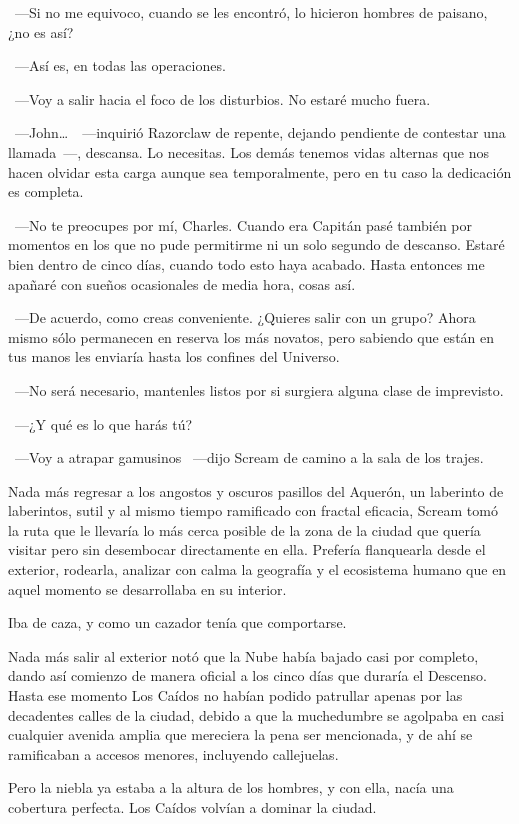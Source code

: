 ~---Si no me equivoco, cuando se les encontró, lo hicieron hombres de paisano, ¿no es así?

~---Así es, en todas las operaciones.

~---Voy a salir hacia el foco de los disturbios. No estaré mucho fuera.

~---John\dots\ ~---inquirió Razorclaw de repente, dejando pendiente de contestar una llamada~---, descansa. Lo necesitas. Los demás tenemos vidas alternas que nos hacen olvidar esta carga aunque sea temporalmente, pero en tu caso la dedicación es completa.

~---No te preocupes por mí, Charles. Cuando era Capitán pasé también por momentos en los que no pude permitirme ni un solo segundo de descanso. Estaré bien dentro de cinco días, cuando todo esto haya acabado. Hasta entonces me apañaré con sueños ocasionales de media hora, cosas así.

~---De acuerdo, como creas conveniente. ¿Quieres salir con un grupo? Ahora mismo sólo permanecen en reserva los más novatos, pero sabiendo que están en tus manos les enviaría hasta los confines del Universo.

~---No será necesario, mantenles listos por si surgiera alguna clase de imprevisto.

~---¿Y qué es lo que harás tú?

~---Voy a atrapar gamusinos ~---dijo Scream de camino a la sala de los trajes.

\bigskip\noindent
Nada más regresar a los angostos y oscuros pasillos del Aquerón, un laberinto de laberintos, sutil y al mismo tiempo ramificado con fractal eficacia, Scream tomó la ruta que le llevaría lo más cerca posible de la zona de la ciudad que quería visitar pero sin desembocar directamente en ella. Prefería flanquearla desde el exterior, rodearla, analizar con calma la geografía y el ecosistema humano que en aquel momento se desarrollaba en su interior.

Iba de caza, y como un cazador tenía que comportarse.

Nada más salir al exterior notó que la Nube había bajado casi por completo, dando así comienzo de manera oficial a los cinco días que duraría el Descenso. Hasta ese momento Los Caídos no habían podido patrullar apenas por las decadentes calles de la ciudad, debido a que la muchedumbre se agolpaba en casi cualquier avenida amplia que mereciera la pena ser mencionada, y de ahí se ramificaban a accesos menores, incluyendo callejuelas.

Pero la niebla ya estaba a la altura de los hombres, y con ella, nacía una cobertura perfecta. Los Caídos volvían a dominar la ciudad.

